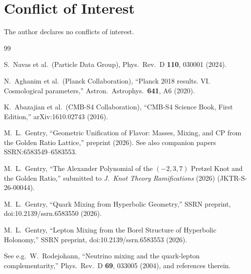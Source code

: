 \documentclass[12pt]{article}
\theoremstyle{definition}
\begin{document}
\section*{Conflict of Interest}
The author declares no conflicts of interest.

\begin{thebibliography}{99}

  S.~Navas et al.\ (Particle Data Group),
  Phys.\ Rev.\ D \textbf{110}, 030001 (2024).

  N.~Aghanim et al.\ (Planck Collaboration),
  ``Planck 2018 results. VI. Cosmological parameters,''
  Astron.\ Astrophys.\ \textbf{641}, A6 (2020).

  K.~Abazajian et al.\ (CMB-S4 Collaboration),
  ``CMB-S4 Science Book, First Edition,''
  arXiv:1610.02743 (2016).

  M.~L.~Gentry,
  ``Geometric Unification of Flavor: Masses, Mixing, and CP
  from the Golden Ratio Lattice,''
  preprint (2026). See also companion papers SSRN:6583549--6583553.

  M.~L.~Gentry,
  ``The Alexander Polynomial of the $(-2,3,7)$ Pretzel Knot
  and the Golden Ratio,''
  submitted to \textit{J.\ Knot Theory Ramifications} (2026)
  (JKTR-S-26-00044).

  M.~L.~Gentry,
  ``Quark Mixing from Hyperbolic Geometry,''
  SSRN preprint, doi:10.2139/ssrn.6583550 (2026).

  M.~L.~Gentry,
  ``Lepton Mixing from the Borel Structure of Hyperbolic Holonomy,''
  SSRN preprint, doi:10.2139/ssrn.6583553 (2026).

  See e.g.\ W.~Rodejohann,
  ``Neutrino mixing and the quark-lepton complementarity,''
  Phys.\ Rev.\ D \textbf{69}, 033005 (2004), and references therein.

\end{thebibliography}
\end{document}
